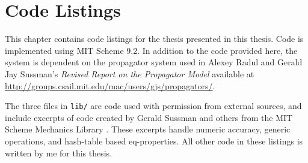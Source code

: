 \chapter{Code Listings}
\label{chap:code}

This chapter contains code listings for the thesis presented in this
thesis. Code is implemented using MIT Scheme 9.2. In addition to the
code provided here, the system is dependent on the propagator system
used in Alexey Radul and Gerald Jay Sussman's \emph{Revised Report on
  the Propagator Model} available at
\url{http://groups.csail.mit.edu/mac/users/gjs/propagators/}.

The three files in \texttt{lib/} are code used with permission from
external sources, and include excerpts of code created by Gerald
Sussman and others from the MIT Scheme Mechanics Library
\cite{scmutils}. These excerpts handle numeric accuracy, generic
operations, and hash-table based eq-properties. All other code in
these listings is written by me for this thesis.

\lstlistoflistings



\newcommand{\includecode}[2][c]{}
\linespread{1}

\addtolength{\oddsidemargin}{-.4in}
\addtolength{\evensidemargin}{-.4in}
\addtolength{\textwidth}{0.8in}

